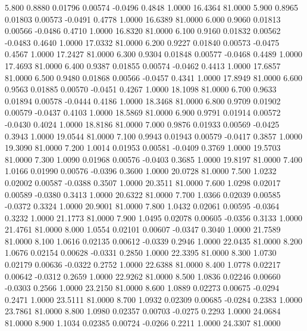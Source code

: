    5.800   0.8880   0.01796   0.00574  -0.0496   0.4848   1.0000  16.4364  81.0000
   5.900   0.8965   0.01803   0.00573  -0.0491   0.4778   1.0000  16.6389  81.0000
   6.000   0.9060   0.01813   0.00566  -0.0486   0.4710   1.0000  16.8320  81.0000
   6.100   0.9160   0.01832   0.00562  -0.0483   0.4640   1.0000  17.0332  81.0000
   6.200   0.9227   0.01840   0.00573  -0.0475   0.4567   1.0000  17.2427  81.0000
   6.300   0.9304   0.01848   0.00577  -0.0468   0.4489   1.0000  17.4693  81.0000
   6.400   0.9387   0.01855   0.00574  -0.0462   0.4413   1.0000  17.6857  81.0000
   6.500   0.9480   0.01868   0.00566  -0.0457   0.4341   1.0000  17.8949  81.0000
   6.600   0.9563   0.01885   0.00570  -0.0451   0.4267   1.0000  18.1098  81.0000
   6.700   0.9633   0.01894   0.00578  -0.0444   0.4186   1.0000  18.3468  81.0000
   6.800   0.9709   0.01902   0.00579  -0.0437   0.4103   1.0000  18.5869  81.0000
   6.900   0.9791   0.01914   0.00572  -0.0430   0.4024   1.0000  18.8186  81.0000
   7.000   0.9876   0.01933   0.00569  -0.0425   0.3943   1.0000  19.0544  81.0000
   7.100   0.9943   0.01943   0.00579  -0.0417   0.3857   1.0000  19.3090  81.0000
   7.200   1.0014   0.01953   0.00581  -0.0409   0.3769   1.0000  19.5703  81.0000
   7.300   1.0090   0.01968   0.00576  -0.0403   0.3685   1.0000  19.8197  81.0000
   7.400   1.0166   0.01990   0.00576  -0.0396   0.3600   1.0000  20.0728  81.0000
   7.500   1.0232   0.02002   0.00587  -0.0388   0.3507   1.0000  20.3511  81.0000
   7.600   1.0298   0.02017   0.00589  -0.0380   0.3413   1.0000  20.6322  81.0000
   7.700   1.0366   0.02039   0.00585  -0.0372   0.3324   1.0000  20.9001  81.0000
   7.800   1.0432   0.02061   0.00595  -0.0364   0.3232   1.0000  21.1773  81.0000
   7.900   1.0495   0.02078   0.00605  -0.0356   0.3133   1.0000  21.4761  81.0000
   8.000   1.0554   0.02101   0.00607  -0.0347   0.3040   1.0000  21.7589  81.0000
   8.100   1.0616   0.02135   0.00612  -0.0339   0.2946   1.0000  22.0435  81.0000
   8.200   1.0676   0.02154   0.00628  -0.0331   0.2850   1.0000  22.3395  81.0000
   8.300   1.0730   0.02179   0.00636  -0.0322   0.2752   1.0000  22.6388  81.0000
   8.400   1.0778   0.02217   0.00642  -0.0312   0.2659   1.0000  22.9262  81.0000
   8.500   1.0836   0.02246   0.00660  -0.0303   0.2566   1.0000  23.2150  81.0000
   8.600   1.0889   0.02273   0.00675  -0.0294   0.2471   1.0000  23.5111  81.0000
   8.700   1.0932   0.02309   0.00685  -0.0284   0.2383   1.0000  23.7861  81.0000
   8.800   1.0980   0.02357   0.00703  -0.0275   0.2293   1.0000  24.0684  81.0000
   8.900   1.1034   0.02385   0.00724  -0.0266   0.2211   1.0000  24.3307  81.0000
